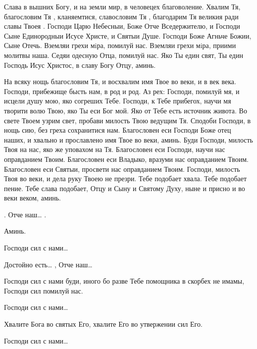 \begin{mymulticols}
Слава в вышних Богу, и на земли мир, в человецех благоволение. Хвалим Тя, благословим Тя , кланяемтися, славословим Тя , благодарим Тя великия ради славы Твоея . Господи Царю Небесныи, Боже Отче Вседержителю, и Господи Сыне Единородныи Исусе Христе, и Святыи Душе. Господи Боже Агньче Божии, Сыне Отечь. Вземляи грехи мiра, помилуй нас. Вземляи грехи мiра, приими молитвы наша. Седяи одесную Отца, помилуй нас. Яко Ты един свят, Ты един Господь Исус Христос, в славу Богу Отцу, аминь.

На всяку нощь благословим Тя, и восхвалим имя Твое во веки, и в век века. Господи, прибежище бысть нам, в род и род. Аз рех: Господи, помилуй мя, и исцели душу мою, яко согреших Тебе. Господи, к Тебе прибегох, научи мя творити волю Твою, яко Ты еси Бог мой. Яко от Тебе есть источник живота. Во свете Твоем узрим свет, пробави милость Твою ведущим Тя. Сподоби Господи, в нощь сию, без греха сохранитися нам. Благословен еси Господи Боже отец наших, и хвально и прославлено имя Твое во веки, аминь. Буди Господи, милость Твоя на нас, яко же уповахом на Тя. Благословен еси Господи, научи нас оправданием Твоим. Благословен еси Владыко, вразуми нас оправданием Твоим. Благословен еси Святыи, просвети нас оправданием Твоим. Господи, милость Твоя во веки, и дела руку Твоею не презри. Тебе подобает хвала. Тебе подобает пение. Тебе слава подобает, Отцу и Сыну и Святому Духу, ныне и присно и во веки веком, аминь.


.  Отче наш… .

Аминь.

 Господи сил с нами…

 Достойно есть…  ,  Отче наш… 



Господи сил с нами буди, иного бо разве Тебе помощника в скорбех не имамы, Господи сил помилуй нас.

 Господи сил с нами…


 Хвалите Бога во святых Его, хвалите Его во утвержении сил Его.


 Господи сил с нами…



\end{mymulticols}
